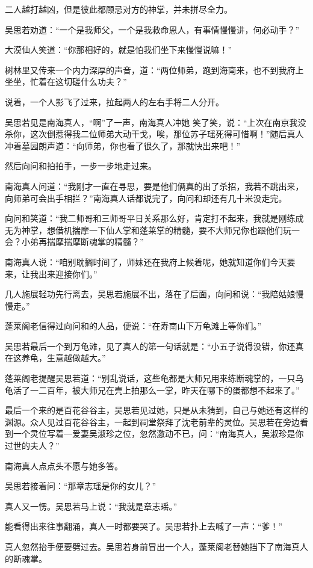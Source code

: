 二人越打越凶，但是彼此都顾忌对方的神掌，并未拼尽全力。

吴思若劝道：“一个是我师父，一个是我救命恩人，有事情慢慢讲，何必动手？”

大漠仙人笑道：“你那相好的，就是怕我们坐下来慢慢说嘛！”

树林里又传来一个内力深厚的声音，道：“两位师弟，跑到海南来，也不到我府上坐坐，忙着在这切磋什么功夫？”

说着，一个人影飞了过来，拉起两人的左右手将二人分开。

吴思若见是南海真人，“啊”了一声，南海真人冲她
笑了笑，说：“上次在南京我没杀你，这次倒惹得我二位师弟大动干戈，唉，那位苏子瑶死得可惜啊！”随后真人冲着墓园朗声道：“向师弟，你也看了很久了，那就快出来吧！”

然后向问和拍拍手，一步一步地走过来。

南海真人问道：“我刚才一直在寻思，要是他们俩真的出了杀招，我若不跳出来，向师弟可会出手相拦？”南海真人话都说完了，向问和却还有几十米没走完。

向问和笑道：“我二师哥和三师哥平日关系那么好，肯定打不起来，我就是刚练成无为神掌，想借机揣摩一下仙人掌和蓬莱掌的精髓，要不大师兄你也跟他们玩一会？小弟再揣摩揣摩断魂掌的精髓？”

南海真人说：“咱别耽搁时间了，师妹还在我府上候着呢，她就知道你们今天要来，让我出来迎接你们。”

几人施展轻功先行离去，吴思若施展不出，落在了后面，向问和说：“我陪姑娘慢慢走。”

蓬莱阁老信得过向问和的人品，便说：“在寿南山下万龟滩上等你们。”

吴思若最后一个到万龟滩，见了真人的第一句话就是：“小五子说得没错，你还真在这养龟，生意越做越大。”

蓬莱阁老提醒吴思若道：“别乱说话，这些龟都是大师兄用来练断魂掌的，一只乌龟活了一二百年，被大师兄在壳上拍那么一掌，昨天在哪下的蛋都想不起来了。”
\newline

最后一个来的是百花谷谷主，吴思若见过她，只是从未猜到，自己与她还有这样的渊源。众人见过百花谷谷主，一起到祠堂祭拜了沈老前辈的灵位。吴思若在旁边看到一个灵位写着—爱妻吴淑珍之位，忽然激动不已，问：“南海真人，吴淑珍是你过世的夫人？”

南海真人点点头不愿与她多答。

吴思若接着问：“那章志瑶是你的女儿？”

真人又一愣。吴思若马上说：“我就是章志瑶。”

能看得出来往事翻涌，真人一时都要哭了。吴思若扑上去喊了一声：“爹！”

真人忽然抬手便要劈过去。吴思若身前冒出一个人，蓬莱阁老替她挡下了南海真人的断魂掌。


